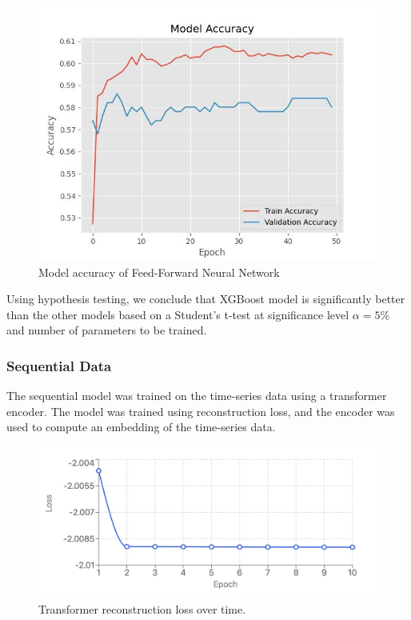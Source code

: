 \documentclass[12pt]{extarticle}
\begin{document}
    \begin{figure}[h!]
        \centering
        \includegraphics[scale=0.8]{"./images/model_accuracy.jpg"}
        \caption{Model accuracy of Feed-Forward Neural Network}
    \end{figure}

    Using hypothesis testing, we conclude that XGBoost model is significantly better than the other models based on a Student's t-test at significance level $\alpha=5\%$ and number of parameters to be trained.

  \subsubsection{Sequential Data}
  
      The sequential model was trained on the time-series data using a transformer encoder. 
      The model was trained using reconstruction loss, and the encoder was used to compute an embedding of the time-series data.

      \begin{figure}
          \centering
          \includegraphics[scale=0.25]{"./images/transformer_loss.jpeg"}
          \caption{Transformer reconstruction loss over time.}
      \end{figure}
\end{document}
